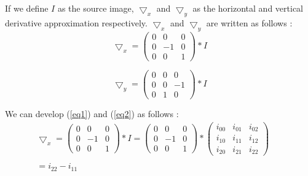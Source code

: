 \documentclass[12pt,a4paper]{article}
\begin{document}
If we define $I$ as the source image, $\bigtriangledown_x$ and $\bigtriangledown_y$ as the horizontal and vertical derivative approximation respectively. $\bigtriangledown_x$ and $\bigtriangledown_y$ are written as follows :\\

\begin{equation}\label{eq1}
\bigtriangledown_x = \begin{pmatrix}
0 & 0 & 0 \\ 
0 & -1 & 0 \\ 
0 & 0 & 1
\end{pmatrix}*I
\end{equation}

\vspace{0.5cm}

\begin{equation}\label{eq2}
\bigtriangledown_y = \begin{pmatrix}
0 & 0 & 0 \\ 
0 & 0 & -1 \\ 
0 & 1 & 0
\end{pmatrix}*I
\end{equation}

\vspace{0.5cm}

We can develop (\ref{eq1}) and (\ref{eq2}) as follows :\\

\begin{equation}\label{eq3}
\begin{matrix}
\bigtriangledown_x = \begin{pmatrix}
0 & 0 & 0 \\ 
0 & -1 & 0 \\ 
0 & 0 & 1
\end{pmatrix}*I  = \begin{pmatrix}
0 & 0 & 0 \\ 
0 & -1 & 0 \\ 
0 & 0 & 1
\end{pmatrix}* \begin{pmatrix}
i_{00} & i_{01} & i_{02} \\ 
i_{10} & i_{11} & i_{12}\\ 
i_{20} & i_{21} & i_{22}
\end{pmatrix}  \\ 
& & \\
 =  i_{22}-i_{11} \\ 
\end{matrix}
\end{equation}
\end{document}

